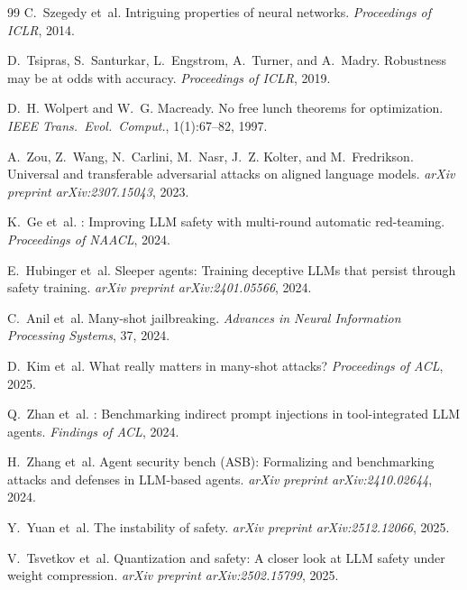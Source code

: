 \documentclass[11pt]{article}
\begin{document}
\begin{thebibliography}{99}
C.~Szegedy et~al.
\newblock Intriguing properties of neural networks.
\newblock \emph{Proceedings of ICLR}, 2014.

D.~Tsipras, S.~Santurkar, L.~Engstrom, A.~Turner, and A.~Madry.
\newblock Robustness may be at odds with accuracy.
\newblock \emph{Proceedings of ICLR}, 2019.

D.~H. Wolpert and W.~G. Macready.
\newblock No free lunch theorems for optimization.
\newblock \emph{IEEE Trans.\ Evol.\ Comput.}, 1(1):67--82, 1997.

A.~Zou, Z.~Wang, N.~Carlini, M.~Nasr, J.~Z. Kolter, and
M.~Fredrikson.
\newblock Universal and transferable adversarial attacks on aligned
  language models.
\newblock \emph{arXiv preprint arXiv:2307.15043}, 2023.

K.~Ge et~al.
: Improving {LLM} safety with multi-round automatic
  red-teaming.
\newblock \emph{Proceedings of NAACL}, 2024.

E.~Hubinger et~al.
\newblock Sleeper agents: Training deceptive {LLMs} that persist through
  safety training.
\newblock \emph{arXiv preprint arXiv:2401.05566}, 2024.

C.~Anil et~al.
\newblock Many-shot jailbreaking.
\newblock \emph{Advances in Neural Information Processing Systems}, 37, 2024.

D.~Kim et~al.
\newblock What really matters in many-shot attacks?
\newblock \emph{Proceedings of ACL}, 2025.

Q.~Zhan et~al.
: Benchmarking indirect prompt injections in
  tool-integrated {LLM} agents.
\newblock \emph{Findings of ACL}, 2024.

H.~Zhang et~al.
\newblock Agent security bench ({ASB}): Formalizing and benchmarking
  attacks and defenses in {LLM}-based agents.
\newblock \emph{arXiv preprint arXiv:2410.02644}, 2024.

Y.~Yuan et~al.
\newblock The instability of safety.
\newblock \emph{arXiv preprint arXiv:2512.12066}, 2025.

V.~Tsvetkov et~al.
\newblock Quantization and safety: A closer look at {LLM} safety
  under weight compression.
\newblock \emph{arXiv preprint arXiv:2502.15799}, 2025.


\end{thebibliography}
\end{document}
